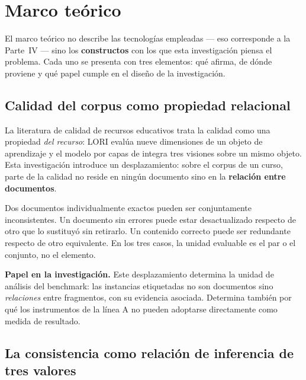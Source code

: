 \section{Marco teórico}
\label{sec:marco-teorico}

El marco teórico no describe las tecnologías empleadas --- eso corresponde a la
Parte~IV --- sino los \textbf{constructos} con los que esta investigación piensa el
problema. Cada uno se presenta con tres elementos: qué afirma, de dónde proviene y
qué papel cumple en el diseño de la investigación.

\subsection{Calidad del corpus como propiedad relacional}
\label{sec:teo-calidad}

La literatura de calidad de recursos educativos trata la calidad como una propiedad
\emph{del recurso}: LORI evalúa nueve dimensiones de un objeto de aprendizaje
\parencite{leacock2007framework} y el modelo por capas de
\textcite{tabares2017modelo} integra tres visiones sobre un mismo objeto. Esta
investigación introduce un desplazamiento: sobre el corpus de un curso, parte de la
calidad no reside en ningún documento sino en la \textbf{relación entre documentos}.

Dos documentos individualmente exactos pueden ser conjuntamente inconsistentes. Un
documento sin errores puede estar desactualizado respecto de otro que lo sustituyó
sin retirarlo. Un contenido correcto puede ser redundante respecto de otro
equivalente. En los tres casos, la unidad evaluable es el par o el conjunto, no el
elemento.

\begin{estado}
\small
\textbf{Papel en la investigación.} Este desplazamiento determina la unidad de
análisis del benchmark: las instancias etiquetadas no son documentos sino
\emph{relaciones} entre fragmentos, con su evidencia asociada. Determina también por
qué los instrumentos de la línea A no pueden adoptarse directamente como medida de
resultado.
\end{estado}

\subsection{La consistencia como relación de inferencia de tres valores}
\label{sec:teo-inferencia}

